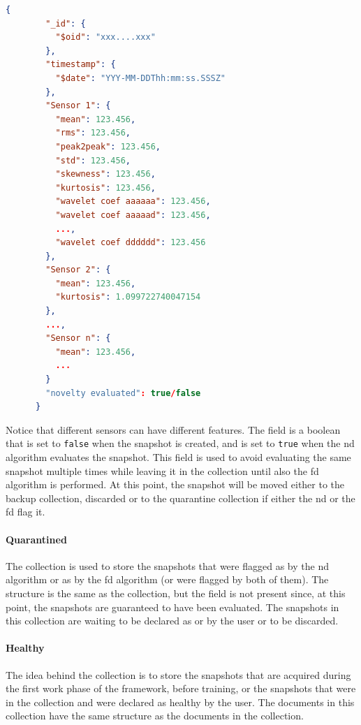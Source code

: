 \begin{lstlisting}[language=json,firstnumber=1]
    {
        "_id": {
          "$oid": "xxx....xxx"
        },
        "timestamp": {
          "$date": "YYY-MM-DDThh:mm:ss.SSSZ"
        },
        "Sensor 1": {
          "mean": 123.456,
          "rms": 123.456,
          "peak2peak": 123.456,
          "std": 123.456,
          "skewness": 123.456,
          "kurtosis": 123.456,
          "wavelet coef aaaaaa": 123.456,
          "wavelet coef aaaaad": 123.456,
          ...,
          "wavelet coef dddddd": 123.456
        },
        "Sensor 2": {
          "mean": 123.456,
          "kurtosis": 1.099722740047154
        },
        ...,
        "Sensor n": {
          "mean": 123.456,
          ...
        }
        "novelty evaluated": true/false
      }
\end{lstlisting}

Notice that different sensors can have different features. The  field is a boolean that is set to \texttt{false} when the snapshot is created, and is set to \texttt{true} when the \gls{nd} algorithm evaluates the snapshot. This field is used to avoid evaluating the same snapshot multiple times while leaving it in the collection until also the \gls{fd} algorithm is performed. At this point, the snapshot will be moved either to the backup collection, discarded or to the quarantine collection if either the \gls{nd} or the \gls{fd} flag it.

\paragraph{Quarantined}
The  collection is used to store the snapshots that were flagged as  by the \gls{nd} algorithm or as  by the \gls{fd} algorithm (or were flagged by both of them). The structure is the same as the  collection, but the  field is not present since, at this point, the snapshots are guaranteed to have been evaluated. The snapshots in this collection are waiting to be declared as  or  by the user or to be discarded.

\paragraph{Healthy}
The idea behind the  collection is to store the snapshots that are acquired during the first work phase of the framework, before training, or the snapshots that were in the  collection and were declared as healthy by the user. The documents in this collection have the same structure as the documents in the  collection.

